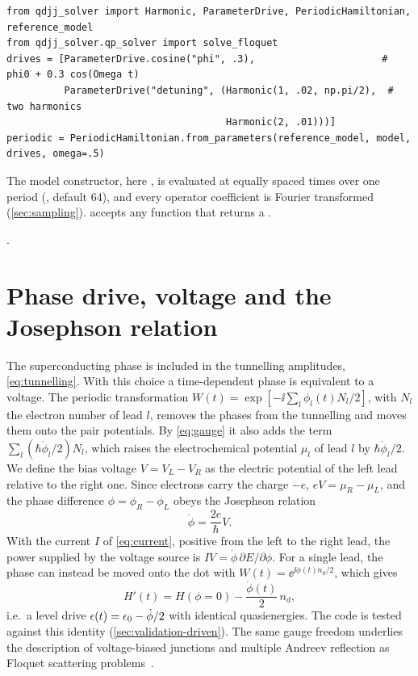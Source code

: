 \begin{incode}
\begin{lstlisting}[frame=none,backgroundcolor={},aboveskip=0pt,belowskip=0pt]
from qdjj_solver import Harmonic, ParameterDrive, PeriodicHamiltonian, reference_model
from qdjj_solver.qp_solver import solve_floquet
drives = [ParameterDrive.cosine("phi", .3),                      # phi0 + 0.3 cos(Omega t)
          ParameterDrive("detuning", (Harmonic(1, .02, np.pi/2),  # two harmonics
                                      Harmonic(2, .01)))]
periodic = PeriodicHamiltonian.from_parameters(reference_model, model, drives, omega=.5)
\end{lstlisting}
The model constructor, here , is evaluated at equally spaced times
over one period (, default 64), and every operator coefficient is Fourier
transformed (\cref{sec:sampling}).  accepts any function
 that returns a .
\par\smallskip{}.
\end{incode}

\section{Phase drive, voltage and the Josephson relation}\label{sec:phase-voltage}

The superconducting phase is included in the tunnelling amplitudes,
\cref{eq:tunnelling}. With this choice a time-dependent phase is equivalent to a voltage.
The periodic transformation $W(t)=\exp[-\ii\sum_l\phi_l(t)N_l/2]$, with $N_l$ the electron
number of lead $l$, removes the phases from the tunnelling and moves them onto the pair
potentials. By \cref{eq:gauge} it also adds the term $\sum_l(\hbar\dot\phi_l/2)N_l$, which
raises the electrochemical potential $\mu_l$ of lead $l$ by $\hbar\dot\phi_l/2$. We define the
bias voltage $V=V_L-V_R$ as the electric potential of the left lead relative to the right
one. Since electrons carry the charge $-e$, $eV=\mu_R-\mu_L$, and the phase difference
$\phi=\phi_R-\phi_L$ obeys the Josephson relation
\begin{equation}\label{eq:josephson}
  \dot\phi=\frac{2e}{\hbar}V .
\end{equation}
With the current $I$ of \cref{eq:current}, positive from the left to the right lead, the
power supplied by the voltage source is $IV=\dot\phi\,\partial E/\partial\phi$. For a single
lead, the phase can instead be moved onto the dot with $W(t)=\ee^{\ii\phi(t)n_d/2}$, which
gives
\begin{equation}\label{eq:phase-to-level}
  H'(t)=H(\phi=0)-\frac{\dot\phi(t)}2\,n_d ,
\end{equation}
i.e.\ a level drive $\epsilon(t)=\epsilon_0-\dot\phi/2$ with identical quasienergies. The code is
tested against this identity (\cref{sec:validation-driven}). The same gauge freedom
underlies the description of voltage-biased junctions and multiple Andreev reflection as
Floquet scattering problems~\cite{averin1995ac,bratus1995theory,cuevas1996hamiltonian,cuevas2002subharmonic}.

